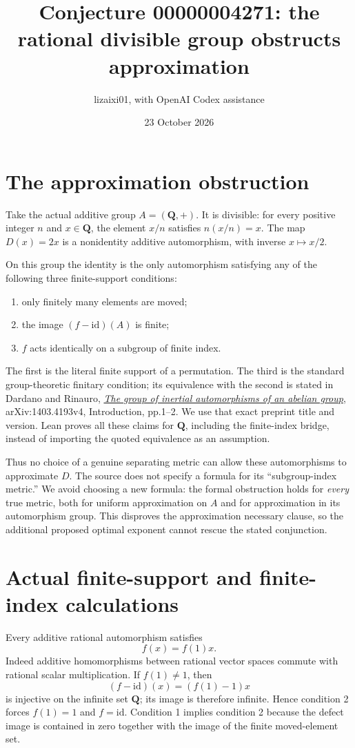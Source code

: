 \documentclass[11pt]{article}
\title{Conjecture 00000004271: the rational divisible group obstructs approximation}
\author{lizaixi01, with OpenAI Codex assistance}
\date{23 October 2026}
\begin{document}
\maketitle
\section{The approximation obstruction}
Take the actual additive group $A=(\mathbf Q,+)$. It is divisible:
for every positive integer $n$ and $x\in\mathbf Q$, the element $x/n$
satisfies $n(x/n)=x$. The map $D(x)=2x$ is a nonidentity additive
automorphism, with inverse $x\mapsto x/2$.

On this group the identity is the only automorphism satisfying any
of the following three finite-support conditions:
\begin{enumerate}
\item only finitely many elements are moved;
\item the image $(f-\mathrm{id})(A)$ is finite;
\item $f$ acts identically on a subgroup of finite index.
\end{enumerate}
The first is the literal finite support of a permutation. The third
is the standard group-theoretic finitary condition; its equivalence
with the second is stated in Dardano and Rinauro,
\href{https://arxiv.org/abs/1403.4193v4}
{\emph{The group of inertial automorphisms of an abelian group}},
arXiv:1403.4193v4, Introduction, pp.1--2. We use that exact preprint
title and version. Lean proves all these claims for $\mathbf Q$,
including the finite-index bridge, instead of importing the quoted
equivalence as an assumption.

Thus no choice of a genuine separating metric can allow these
automorphisms to approximate $D$. The source does not specify a
formula for its ``subgroup-index metric.'' We avoid choosing a new
formula: the formal obstruction holds for \emph{every} true metric,
both for uniform approximation on $A$ and for approximation in its
automorphism group. This disproves the approximation necessary clause,
so the additional proposed optimal exponent cannot rescue the stated
conjunction.

\section{Actual finite-support and finite-index calculations}
Every additive rational automorphism satisfies
\[
 f(x)=f(1)x.
\]
Indeed additive homomorphisms between rational vector spaces commute
with rational scalar multiplication. If $f(1)\ne1$, then
\[
 (f-\mathrm{id})(x)=(f(1)-1)x
\]
is injective on the infinite set $\mathbf Q$; its image is therefore
infinite. Hence condition 2 forces $f(1)=1$ and $f=\mathrm{id}$.
Condition 1 implies condition 2 because the defect image is contained
in zero together with the image of the finite moved-element set.
\end{document}
